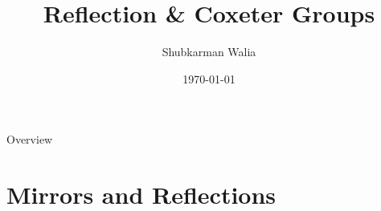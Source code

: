 \documentclass[aspectratio=169,xcolor=dvipsnames]{beamer}
\title{Reflection \& Coxeter Groups}
\author{Shubkarman Walia}
\date{\today} %
\begin{document}
\begin{frame}
    \titlepage
\end{frame}

\begin{frame}{Overview}
    \tableofcontents
\end{frame}

\section{Mirrors and Reflections}
\end{document}
